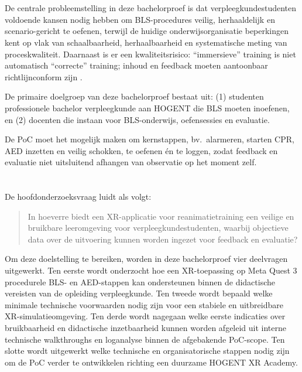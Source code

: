 \section{}%
\label{sec:probleemstelling}

De centrale probleemstelling in deze bachelorproef is dat verpleegkundestudenten voldoende kansen nodig hebben om BLS-procedures veilig, herhaaldelijk en scenario-gericht te oefenen, terwijl de huidige onderwijsorganisatie beperkingen kent op vlak van schaalbaarheid, herhaalbaarheid en systematische meting van proceskwaliteit.
Daarnaast is er een kwaliteitsrisico: ``immersieve'' training is niet automatisch ``correcte'' training; inhoud en feedback moeten aantoonbaar richtlijnconform zijn \autocite{ERC2025BLS,AHA2025Guidelines}.

De primaire doelgroep van deze bachelorproef bestaat uit:
(1) studenten professionele bachelor verpleegkunde aan HOGENT die BLS moeten inoefenen,
en (2) docenten die instaan voor BLS-onderwijs, oefensessies en evaluatie.

De PoC moet het mogelijk maken om kernstappen, bv.\ alarmeren, starten CPR, AED inzetten en veilig schokken, te oefenen én te loggen, zodat feedback en evaluatie niet uitsluitend afhangen van observatie op het moment zelf.

\section{}%
\label{sec:onderzoeksvraag}

De hoofdonderzoeksvraag luidt als volgt:

\begin{quote}
    In hoeverre biedt een XR-applicatie voor reanimatietraining een veilige en bruikbare leeromgeving voor verpleegkundestudenten, waarbij objectieve data over de uitvoering kunnen worden ingezet voor feedback en evaluatie?
\end{quote}

Om deze doelstelling te bereiken, worden in deze bachelorproef vier deelvragen uitgewerkt. Ten eerste wordt onderzocht hoe een XR-toepassing op Meta Quest 3 procedurele BLS- en AED-stappen kan ondersteunen binnen de didactische vereisten van de opleiding verpleegkunde. Ten tweede wordt bepaald welke minimale technische voorwaarden nodig zijn voor een stabiele en uitbreidbare XR-simulatieomgeving. Ten derde wordt nagegaan welke eerste indicaties over bruikbaarheid en didactische inzetbaarheid kunnen worden afgeleid uit interne technische walkthroughs en loganalyse binnen de afgebakende PoC-scope. Ten slotte wordt uitgewerkt welke technische en organisatorische stappen nodig zijn om de PoC verder te ontwikkelen richting een duurzame HOGENT XR Academy.

